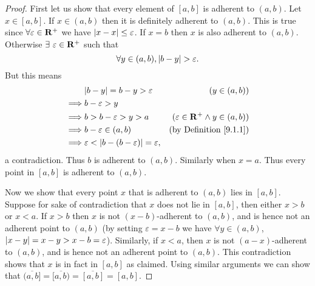 \begin{proof}
    First let us show that every element of \([a, b]\) is adherent to \((a, b)\).
    Let \(x \in [a, b]\).
    If \(x \in (a, b)\) then it is definitely adherent to \((a, b)\).
    This is true since \(\forall \varepsilon \in \mathbf{R}^+\) we have \(\left\lvert x - x\right\rvert \leq \varepsilon\).
    If \(x = b\) then \(x\) is also adherent to \((a, b)\).
    Otherwise \(\exists\ \varepsilon \in \mathbf{R}^+\) such that
    \[
        \forall y \in (a, b), \left\lvert b - y\right\rvert > \varepsilon.
    \]
    But this means
    \begin{align*}
                 & \abs{b - y} = b - y > \varepsilon                        & (y \in (a, b))                            \\
        \implies & b - \varepsilon > y                                                                                  \\
        \implies & b > b - \varepsilon > y > a                              & (\varepsilon \in \R^+ \land y \in (a, b)) \\
        \implies & b - \varepsilon \in (a, b)                               & \text{(by Definition \ref{9.1.1})}        \\
        \implies & \varepsilon < \abs{b - (b - \varepsilon)} = \varepsilon,
    \end{align*}
    a contradiction.
    Thus \(b\) is adherent to \((a, b)\).
    Similarly when \(x = a\).
    Thus every point in \([a, b]\) is adherent to \((a, b)\).

    Now we show that every point \(x\) that is adherent to \((a, b)\) lies in \([a, b]\).
    Suppose for sake of contradiction that \(x\) does not lie in \([a, b]\), then either \(x > b\) or \(x < a\).
    If \(x > b\) then \(x\) is not \((x - b)\)-adherent to \((a, b)\), and is hence not an adherent point to \((a, b)\)
    (by setting \(\varepsilon = x - b\) we have \(\forall y \in (a, b)\), \(\left\lvert x - y\right\rvert = x - y > x - b = \varepsilon\)).
    Similarly, if \(x < a\), then \(x\) is not \((a - x)\)-adherent to \((a, b)\), and is hence not an adherent point to \((a, b)\).
    This contradiction shows that \(x\) is in fact in \([a, b]\) as claimed.
    Using similar arguments we can show that \(\overline{(a, b]} = \overline{[a, b)} = \overline{[a, b]} = [a, b]\).


\end{proof}
